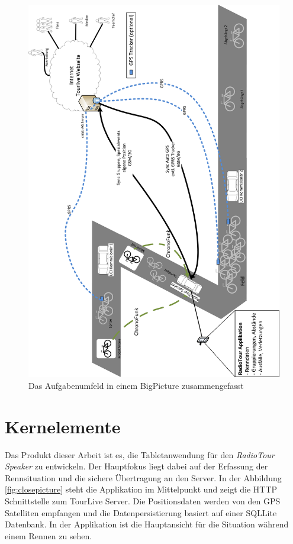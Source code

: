 \begin{figure}[h!]
\caption{Das Aufgabenumfeld in einem BigPicture zusammengefasst}
\centering
\includegraphics[scale=0.7]{05bericht/images/bigpicture.png}
\end{figure}

\newpage

\section{Kernelemente}
Das Produkt dieser Arbeit ist es, die Tabletanwendung für den \textit{RadioTour Speaker} zu entwickeln. Der Hauptfokus liegt dabei auf der Erfassung der Rennsituation und die sichere Übertragung an den Server. In der Abbildung \ref{fig:closepicture} steht die Applikation im Mittelpunkt und zeigt die HTTP Schnittstelle zum TourLive Server. Die Positionsdaten werden von den GPS Satelliten empfangen und die Datenpersistierung basiert auf einer SQLLite Datenbank. In der Applikation ist die Hauptansicht für die Situation während einem Rennen zu sehen.
\\

